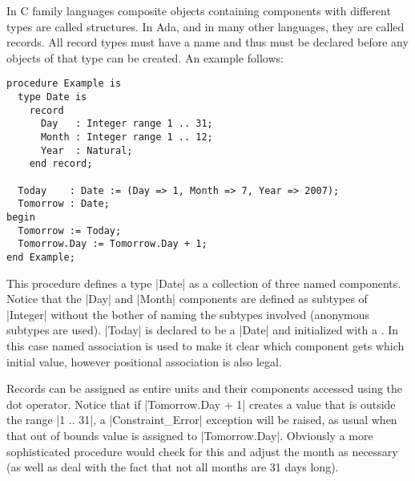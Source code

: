 In C family languages composite objects containing components with different types are called
structures. In Ada, and in many other languages, they are called records. All record types must
have a name and thus must be declared before any objects of that type can be created. An example
follows:

\begin{lstlisting}
procedure Example is
  type Date is
    record
      Day   : Integer range 1 .. 31;
      Month : Integer range 1 .. 12;
      Year  : Natural;
    end record;

  Today    : Date := (Day => 1, Month => 7, Year => 2007);
  Tomorrow : Date;
begin
  Tomorrow := Today;
  Tomorrow.Day := Tomorrow.Day + 1;
end Example;
\end{lstlisting}

This procedure defines a type |Date| as a collection of three named components. Notice that the
|Day| and |Month| components are defined as subtypes of |Integer| without the bother of naming
the subtypes involved (anonymous subtypes are used). |Today| is declared to be a |Date| and
initialized with a . In this case named association is used to make it
clear which component gets which initial value, however positional association is also legal.

Records can be assigned as entire units and their components accessed using the dot operator.
Notice that if |Tomorrow.Day + 1| creates a value that is outside the range |1 .. 31|, a
|Constraint_Error| exception will be raised, as usual when that out of bounds value is assigned
to |Tomorrow.Day|. Obviously a more sophisticated procedure would check for this and adjust the
month as necessary (as well as deal with the fact that not all months are 31 days long).


